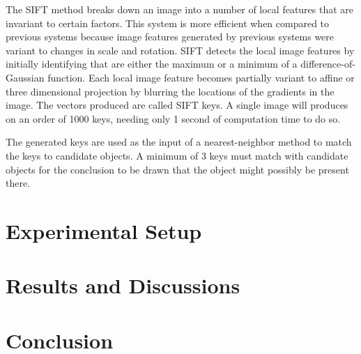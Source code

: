 \documentclass[]{IEEEphot}
\begin{document}
The SIFT method breaks down an image into a number of local features that are invariant to certain factors. This system is more efficient when compared to previous systems because image features generated by previous systems were variant to changes in scale and rotation. SIFT detects the local image features by initially identifying that are either the maximum or a minimum of a difference-of-Gaussian function.  Each local image feature becomes partially variant to affine or three dimensional projection by blurring the locations of the gradients in the image. The vectors produced are called SIFT keys. A single image will produces on an order of 1000 keys, needing only 1 second of computation time to do so.

The generated keys are used as the input of a nearest-neighbor method to match the keys to candidate objects. A minimum of 3 keys must match with candidate objects for the conclusion to be drawn that the object might possibly be present there.


\section{Experimental Setup}

\section{Results and Discussions}




\section{Conclusion}
\end{document}
